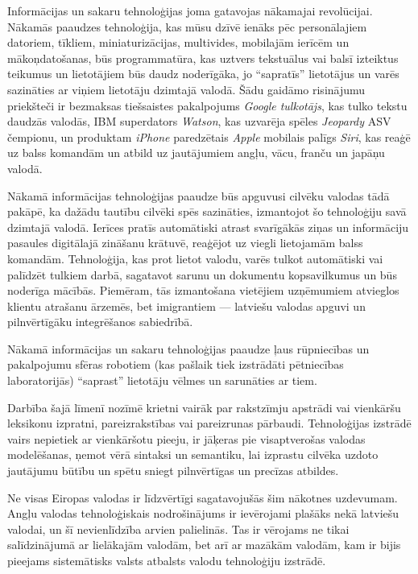 \begin{multicols}{2}
Informācijas un sakaru tehnoloģijas joma gatavojas nākamajai revolūcijai.
Nākamās paaudzes tehnoloģija, kas mūsu dzīvē ienāks pēc personālajiem datoriem, tīkliem, miniaturizācijas, multivides, mobilajām ierīcēm un mākoņdatošanas, būs programmatūra, kas uztvers tekstuālus vai balsī izteiktus teikumus un lietotājiem būs daudz noderīgāka, jo “sapratīs” lietotājus un varēs sazināties ar viņiem lietotāju dzimtajā valodā.
Šādu gaidāmo risinājumu priekšteči ir bezmaksas tiešsaistes pakalpojums \textit{Google tulkotājs}, kas tulko tekstu daudzās valodās, IBM superdators \textit{Watson}, kas uzvarēja spēles \textit{Jeopardy} ASV čempionu, un produktam \textit{iPhone} paredzētais \textit{Apple} mobilais palīgs \textit{Siri}, kas reaģē uz balss komandām un atbild uz jautājumiem angļu, vācu, franču un japāņu valodā. 

Nākamā informācijas tehnoloģijas paaudze būs apguvusi cilvēku valodas tādā pakāpē, ka dažādu tautību cilvēki spēs sazināties, izmantojot šo tehnoloģiju savā dzimtajā valodā.  Ierīces pratīs automātiski atrast svarīgākās ziņas un informāciju pasaules digitālajā zināšanu krātuvē, reaģējot uz viegli lietojamām balss komandām.  Tehnoloģija, kas prot lietot valodu, varēs tulkot automātiski vai palīdzēt tulkiem darbā, sagatavot sarunu un dokumentu kopsavilkumus un būs noderīga mācībās.  Piemēram, tās izmantošana vietējiem uzņēmumiem atvieglos klientu atrašanu ārzemēs, bet imigrantiem --- latviešu valodas apguvi un pilnvērtīgāku integrēšanos sabiedrībā.

Nākamā informācijas un sakaru tehnoloģijas paaudze ļaus rūpniecības un pakalpojumu sfēras robotiem (kas pašlaik tiek izstrādāti pētniecības laboratorijās) “saprast” lietotāju vēlmes un sarunāties ar tiem. 

Darbība šajā līmenī nozīmē krietni vairāk par rakstzīmju apstrādi vai vienkāršu leksikonu izpratni, pareizrakstības vai pareizrunas pārbaudi.
Tehnoloģijas izstrādē vairs nepietiek ar vienkāršotu pieeju, ir jāķeras pie visaptverošas valodas modelēšanas, ņemot vērā sintaksi un semantiku, lai izprastu cilvēka uzdoto \mbox{jautājumu} \mbox{būtību} un spētu sniegt pilnvērtīgas un precīzas atbildes.

Ne visas Eiropas valodas ir līdzvērtīgi sagatavojušās šim nākotnes uzdevumam.
Angļu valodas tehnoloģiskais nodrošinājums ir ievērojami plašāks nekā latviešu valodai, un šī nevienlīdzība arvien palielinās.
Tas ir vērojams ne tikai salīdzinājumā ar lielākajām valodām, bet arī ar mazākām valodām, kam ir bijis pieejams sistemātisks valsts atbalsts valodu tehnoloģiju izstrādē. 


\end{multicols}
